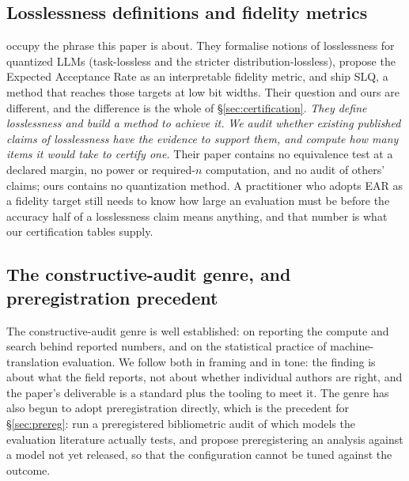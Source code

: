 \subsection{Losslessness definitions and fidelity metrics}
\label{app:related:lossless}

\citet{helcig2026slq} occupy the phrase this paper is about. They formalise
notions of losslessness for quantized LLMs (task-lossless and the stricter
distribution-lossless), propose the Expected Acceptance Rate as an interpretable
fidelity metric, and ship SLQ, a method that reaches those targets at low bit
widths. Their question and ours are different, and the difference is the whole
of \S\ref{sec:certification}. \emph{They define losslessness and build a method
to achieve it.} \emph{We audit whether existing published claims of losslessness
have the evidence to support them, and compute how many items it would take to
certify one.} Their paper contains no equivalence test at a declared margin, no
power or required-$n$ computation, and no audit of others' claims; ours contains
no quantization method. A practitioner who adopts EAR as a fidelity target still
needs to know how large an evaluation must be before the accuracy half of a
losslessness claim means anything, and that number is what our certification
tables supply.

\subsection{The constructive-audit genre, and preregistration precedent}
\label{app:related:genre}

The constructive-audit genre is well established: \citet{dodge2019showyourwork}
on reporting the compute and search behind reported numbers, and
\citet{marie2021mtaudit} on the statistical practice of machine-translation
evaluation. We follow both in framing and in tone: the finding is about what the
field reports, not about whether individual authors are right, and the paper's
deliverable is a standard plus the tooling to meet it. The genre has also begun
to adopt preregistration directly, which is the precedent for
\S\ref{sec:prereg}: \citet{gringras2026frontierlag} run a preregistered
bibliometric audit of which models the evaluation literature actually tests, and
\citet{thomas2026prereg} propose preregistering an analysis against a model not
yet released, so that the configuration cannot be tuned against the outcome.

